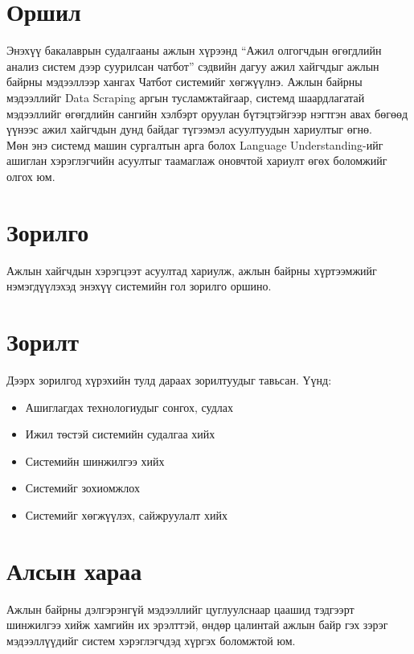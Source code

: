 \section{Оршил}
\quad Энэхүү бакалаврын судалгааны ажлын хүрээнд ``Ажил олгогчдын өгөгдлийн анализ систем дээр суурилсан чатбот'' сэдвийн дагуу ажил хайгчдыг ажлын байрны мэдээллээр хангах Чатбот системийг хөгжүүлнэ. Ажлын байрны мэдээллийг Data Scraping аргын тусламжтайгаар, системд шаардлагатай мэдээллийг өгөгдлийн сангийн хэлбэрт оруулан бүтэцтэйгээр нэгтгэн авах бөгөөд үүнээс ажил хайгчдын дунд байдаг түгээмэл асуултуудын хариултыг өгнө.
\\Мөн энэ системд машин сургалтын арга болох Language Understanding-ийг ашиглан хэрэглэгчийн асуултыг таамаглаж оновчтой хариулт өгөх боломжийг олгох юм. 
\section{Зорилго}
\quad Ажлын хайгчдын хэрэгцээт асуултад хариулж, ажлын байрны хүртээмжийг нэмэгдүүлэхэд энэхүү системийн гол зорилго оршино.
\section{Зорилт}
\quad Дээрх зорилгод хүрэхийн тулд дараах зорилтуудыг тавьсан. Үүнд:
\begin{itemize}
	\item Ашиглагдах технологиудыг сонгох, судлах
	\item Ижил төстэй системийн судалгаа хийх
	\item Системийн шинжилгээ хийх
	\item Системийг зохиомжлох
	\item Системийг хөгжүүлэх, сайжруулалт хийх
\end{itemize}
\section{Алсын хараа}
\quad Ажлын байрны дэлгэрэнгүй мэдээллийг цуглуулснаар цаашид тэдгээрт шинжилгээ хийж хамгийн их эрэлттэй, өндөр цалинтай ажлын байр гэх зэрэг мэдээллүүдийг систем хэрэглэгчдэд хүргэх боломжтой юм. 